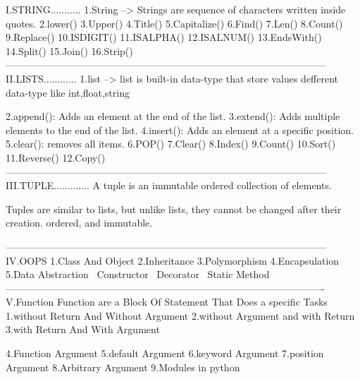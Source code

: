 I.STRING...........
1.String --> Strings are sequence of characters written inside quotes. 
2.lower()
3.Upper()
4.Title()
5.Capitalize()
6.Find()
7.Len()
8.Count()
9.Replace()
10.ISDIGIT()
11.ISALPHA()
12.ISALNUM()
13.EndsWith()
14.Split()
15.Join()
16.Strip()
--------------------------------------------------------------------------------------------------
II.LISTS............
1.list --> list is built-in data-type that store values defferent data-type like int,float,string

2.append(): Adds an element at the end of the list.
3.extend(): Adds multiple elements to the end of the list.
4.insert(): Adds an element at a specific position.
5.clear(): removes all items.
6.POP()
7.Clear()
8.Index()
9.Count()
10.Sort()
11.Reverse()
12.Copy()
--------------------------------------------------------------------------------------------------
III.TUPLE.............
A tuple is an immutable ordered collection of elements.

Tuples are similar to lists, but unlike lists, they cannot be changed after their creation.
ordered, and immutable.

--------------------------------------------------------------------------------------------------
IV.OOPS
1.Class And Object
2.Inheritance
3.Polymorphism
4.Encapsulation
5.Data Abstraction
~Constructor
~Decorator
~Static Method
-------------------------------------------------------------------------------------------------
V.Function
Function are a Block Of Statement That Does a specific Tasks
1.without Return And Without Argument
2.without Argument and with Return 
3.with Return And With Argument

4.Function Argument
5.default Argument
6.keyword Argument
7.position Argument
8.Arbitrary Argument
9.Modules in python



